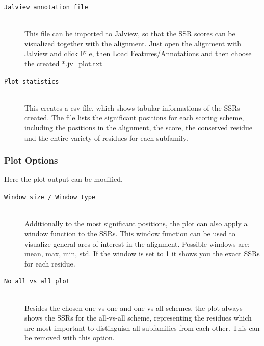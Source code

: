 \documentclass[a4paper,10pt]{article}
\begin{document}
\begin{description}

\item[\texttt{Jalview annotation file}] \hfill \\

This file can be imported to Jalview, so that the SSR scores can 
be visualized together with the alignment. Just open the alignment with Jalview and 
click File, then Load Features/Annotations and then choose the created *.jv\_plot.txt 

\item[\texttt{Plot statistics}] \hfill \\

This creates a csv file, which shows tabular informations of the SSRs created. 
The file lists the significant positions for each scoring scheme, including the positions in the alignment,
the score, the conserved residue and the entire variety of residues for each subfamily. 

\end{description}

\subsubsection{Plot Options}

Here the plot output can be modified.

\begin{description}

\item[\texttt{Window size / Window type}] \hfill \\

Additionally to the most significant positions, the plot can also apply a window function to the SSRs.
This window function can be used to visualize general ares of interest in the alignment. 
Possible windows are: mean, max, min, std. 
If the window is set to 1 it shows you the exact SSRs for each residue.

\item[\texttt{No all vs all plot}] \hfill \\

Besides the chosen one-vs-one and one-vs-all schemes, the plot always shows the SSRs for the all-vs-all scheme, representing the residues
which are most important to distinguish all subfamilies from each other. This can be removed with this option.

\end{description}
\end{document}
